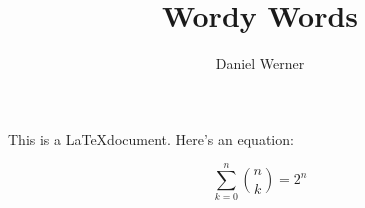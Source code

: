 \documentclass{article}
\title{Wordy Words}
\author{Daniel Werner}
\begin{document}
\maketitle

This is a \LaTeX document. Here's an equation:

\begin{equation}
    \sum_{k=0}^n \left. n \choose k \right. = 2^n
\end{equation}
\end{document}
